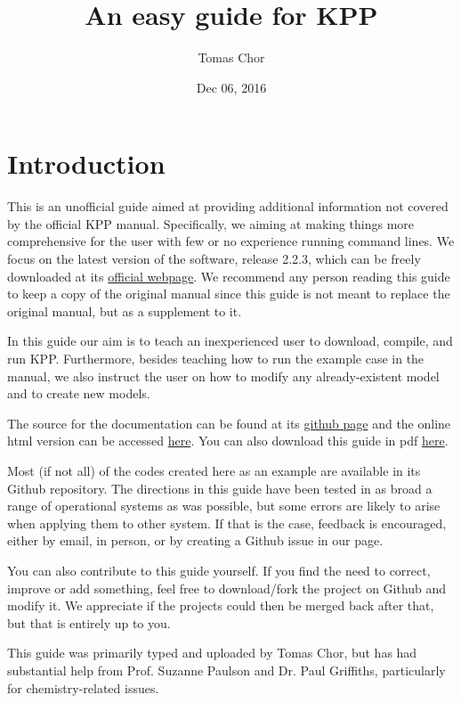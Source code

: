 \documentclass[letterpaper,10pt,openany,oneside]{sphinxmanual}
\title{An easy guide for KPP}
\date{Dec 06, 2016}
\author{Tomas Chor}
\begin{document}
\maketitle
\tableofcontents
{}\label{index::doc}



\chapter{Introduction}
\label{README:introduction}\label{README:easy-guide-to-compiling-and-running-kpp}\label{README::doc}
This is an unofficial guide aimed at providing additional information not
covered by the official KPP manual. Specifically, we aiming at making things
more comprehensive for the user with few or no experience running command
lines. We focus on the latest version of the software, release 2.2.3, which can
be freely downloaded at its \href{http://people.cs.vt.edu/~asandu/Software/Kpp/}{official webpage}. We recommend any person
reading this guide to keep a copy of the original manual since this guide is
not meant to replace the original manual, but as a supplement to it.

In this guide our aim is to teach an inexperienced user to download, compile,
and run KPP. Furthermore, besides teaching how to run the example case in the
manual, we also instruct the user on how to modify any already-existent model
and to create new models.

The source for the documentation can be found at its \href{https://github.com/tomchor/ezkpp}{github page} and the online html version can be
accessed \href{https://tomchor.github.io/ezkpp/}{here}. You can also download this
guide in pdf \href{https://github.com/tomchor/ezkpp/raw/gh-pages/ezkpp.pdf}{here}.

Most (if not all) of the codes created here as an example are available in its
Github repository. The directions in this guide have been tested in as broad a
range of operational systems as was possible, but some errors are likely to
arise when applying them to other system. If that is the case, feedback is
encouraged, either by email, in person, or by creating a Github issue in our
page.

You can also contribute to this guide yourself. If you find the need to
correct, improve or add something, feel free to download/fork the project on
Github and modify it. We appreciate if the projects could then be merged back
after that, but that is entirely up to you.

This guide was primarily typed and uploaded by Tomas Chor, but has had
substantial help from Prof. Suzanne Paulson and Dr. Paul Griffiths,
particularly for chemistry-related issues.
\end{document}
